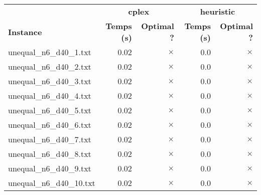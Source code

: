 \documentclass{article}
\begin{document}
\newpage
\begin{center}
\renewcommand{\arraystretch}{1.4} 
 \begin{tabular}{lrrrr}
	\hline
 & \multicolumn{2}{c}{\textbf{cplex}} & \multicolumn{2}{c}{\textbf{heuristic}}\\
\textbf{Instance}  & \textbf{Temps (s)} & \textbf{Optimal ?}  & \textbf{Temps (s)} & \textbf{Optimal ?} \\\hline

unequal\_n6\_d40\_1.txt & 0.02 & 
$\times$
 & 0.0 & 
$\times$
\\
unequal\_n6\_d40\_2.txt & 0.02 & 
$\times$
 & 0.0 & 
$\times$
\\
unequal\_n6\_d40\_3.txt & 0.02 & 
$\times$
 & 0.0 & 
$\times$
\\
unequal\_n6\_d40\_4.txt & 0.02 & 
$\times$
 & 0.0 & 
$\times$
\\
unequal\_n6\_d40\_5.txt & 0.02 & 
$\times$
 & 0.0 & 
$\times$
\\
unequal\_n6\_d40\_6.txt & 0.02 & 
$\times$
 & 0.0 & 
$\times$
\\
unequal\_n6\_d40\_7.txt & 0.02 & 
$\times$
 & 0.0 & 
$\times$
\\
unequal\_n6\_d40\_8.txt & 0.02 & 
$\times$
 & 0.0 & 
$\times$
\\
unequal\_n6\_d40\_9.txt & 0.02 & 
$\times$
 & 0.0 & 
$\times$
\\
unequal\_n6\_d40\_10.txt & 0.02 & 
$\times$
 & 0.0 & 
$\times$
\\
\hline\end{tabular}
\end{center}
\end{document}
